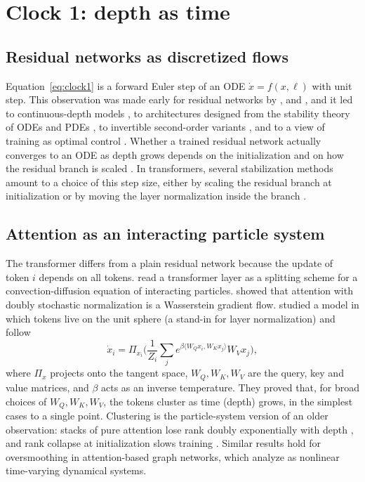 \section{Clock 1: depth as time}
\label{sec:clock1}

\subsection{Residual networks as discretized flows}

Equation~\eqref{eq:clock1} is a forward Euler step of an ODE $\dot x = f(x,\ell)$ with unit step. This observation was made early for residual networks \citep{he2015deep} by \citet{e2017proposal}, \citet{haber2017stable} and \citet{lu2017finite}, and it led to continuous-depth models \citep{chen2018neural}, to architectures designed from the stability theory of ODEs and PDEs \citep{haber2017stable,ruthotto2018deep,chang2019antisymmetricrnn}, to invertible second-order variants \citep{sander2021momentum}, and to a view of training as optimal control \citep{e2018meanfield}. Whether a trained residual network actually converges to an ODE as depth grows depends on the initialization and on how the residual branch is scaled \citep{sander2022residual}. In transformers, several stabilization methods amount to a choice of this step size, either by scaling the residual branch at initialization \citep{bachlechner2020rezero,wang2022deepnet} or by moving the layer normalization inside the branch \citep{xiong2020layer,liu2020difficulty}.

\subsection{Attention as an interacting particle system}
\label{sec:particles}

The transformer differs from a plain residual network because the update of token $i$ depends on all tokens. \citet{lu2019improving} read a transformer layer as a splitting scheme for a convection-diffusion equation of interacting particles. \citet{sander2021sinkformers} showed that attention with doubly stochastic normalization is a Wasserstein gradient flow. \citet{geshkovski2023emergence,geshkovski2023mathematical} studied a model in which tokens live on the unit sphere (a stand-in for layer normalization) and follow
\begin{equation}
\dot x_i = \Pi_{x_i}\Big(\frac{1}{Z_i}\sum_{j} e^{\beta\langle W_Q x_i, W_K x_j\rangle} W_V x_j\Big),
\label{eq:particles}
\end{equation}
where $\Pi_x$ projects onto the tangent space, $W_Q,W_K,W_V$ are the query, key and value matrices, and $\beta$ acts as an inverse temperature. They proved that, for broad choices of $W_Q,W_K,W_V$, the tokens cluster as time (depth) grows, in the simplest cases to a single point. Clustering is the particle-system version of an older observation: stacks of pure attention lose rank doubly exponentially with depth \citep{dong2021attention}, and rank collapse at initialization slows training \citep{noci2022signal}. Similar results hold for oversmoothing in attention-based graph networks, which \citet{wu2023demystifying} analyze as nonlinear time-varying dynamical systems.

